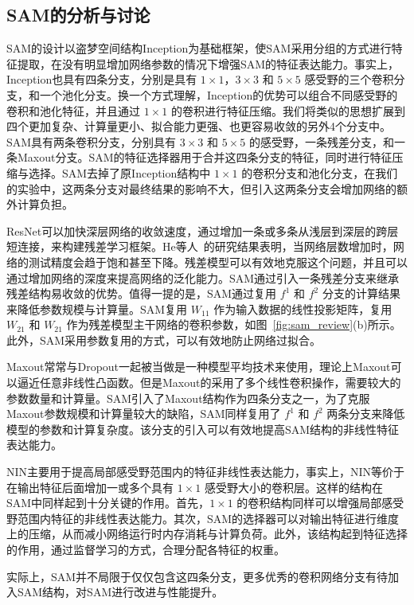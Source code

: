 \subsection{SAM的分析与讨论}
\label{sec:sap:model:discuss}

SAM的设计以盗梦空间结构Inception为基础框架，使SAM采用分组的方式进行特征提取，在没有明显增加网络参数的情况下增强SAM的特征表达能力。事实上，Inception也具有四条分支，分别是具有 $1\times1$，$3\times3$ 和 $5\times5$ 感受野的三个卷积分支，和一个池化分支。换一个方式理解，Inception的优势可以组合不同感受野的卷积和池化特征，并且通过 $1\times1$ 的卷积进行特征压缩。我们将类似的思想扩展到四个更加复杂、计算量更小、拟合能力更强、也更容易收敛的另外4个分支中。SAM具有两条卷积分支，分别具有 $3\times3$ 和 $5\times5$ 的感受野，一条残差分支，和一条Maxout分支。SAM的特征选择器用于合并这四条分支的特征，同时进行特征压缩与选择。SAM去掉了原Inception结构中 $1\times1$ 的卷积分支和池化分支，在我们的实验中，这两条分支对最终结果的影响不大，但引入这两条分支会增加网络的额外计算负担。

ResNet可以加快深层网络的收敛速度，通过增加一条或多条从浅层到深层的跨层短连接，来构建残差学习框架。He等人~\cite{he2015deep}的研究结果表明，当网络层数增加时，网络的测试精度会趋于饱和甚至下降。残差模型可以有效地克服这个问题，并且可以通过增加网络的深度来提高网络的泛化能力。SAM通过引入一条残差分支来继承残差结构易收敛的优势。值得一提的是，SAM通过复用 $f^{1}$ 和 $f^{2}$ 分支的计算结果来降低参数规模与计算量。SAM复用 $W_{11}$ 作为输入数据的线性投影矩阵，复用 $W_{21}$ 和 $W_{21}$ 作为残差模型主干网络的卷积参数，如图~\ref{fig:sam_review}(b)所示。此外，SAM采用参数复用的方式，可以有效地防止网络过拟合。

Maxout常常与Dropout一起被当做是一种模型平均技术来使用，理论上Maxout可以逼近任意非线性凸函数。但是Maxout的采用了多个线性卷积操作，需要较大的参数数量和计算量。SAM引入了Maxout结构作为四条分支之一，为了克服Maxout参数规模和计算量较大的缺陷，SAM同样复用了 $f^{1}$ 和 $f^{2}$ 两条分支来降低模型的参数和计算复杂度。该分支的引入可以有效地提高SAM结构的非线性特征表达能力。

NIN主要用于提高局部感受野范围内的特征非线性表达能力，事实上，NIN等价于在输出特征后面增加一或多个具有 $1{\times}1$ 感受野大小的卷积层。这样的结构在SAM中同样起到十分关键的作用。首先，$1\times1$ 的卷积结构同样可以增强局部感受野范围内特征的非线性表达能力。其次，SAM的选择器可以对输出特征进行维度上的压缩，从而减小网络运行时内存消耗与计算负荷。此外，该结构起到特征选择的作用，通过监督学习的方式，合理分配各特征的权重。

实际上，SAM并不局限于仅仅包含这四条分支，更多优秀的卷积网络分支有待加入SAM结构，对SAM进行改进与性能提升。

